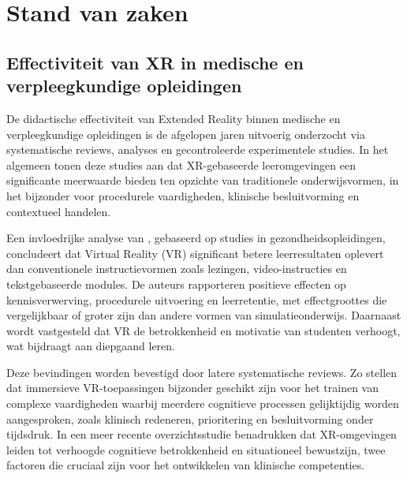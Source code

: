 \chapter{Stand van zaken}%
\label{ch:stand-van-zaken}


\section{Effectiviteit van XR in medische en verpleegkundige opleidingen}

De didactische effectiviteit van Extended Reality binnen medische en verpleegkundige opleidingen is de afgelopen jaren uitvoerig onderzocht via systematische reviews, analyses en gecontroleerde experimentele studies. In het algemeen tonen deze studies aan dat XR-gebaseerde leeromgevingen een significante meerwaarde bieden ten opzichte van traditionele onderwijsvormen, in het bijzonder voor procedurele vaardigheden, klinische besluitvorming en contextueel handelen.

Een invloedrijke analyse van \textcite{Kyaw2019VR}, gebaseerd op studies in gezondheidsopleidingen, concludeert dat Virtual Reality (VR) significant betere leerresultaten oplevert dan conventionele instructievormen zoals lezingen, video-instructies en tekstgebaseerde modules. De auteurs rapporteren positieve effecten op kennisverwerving, procedurele uitvoering en leerretentie, met effectgroottes die vergelijkbaar of groter zijn dan andere vormen van simulatieonderwijs. Daarnaast wordt vastgesteld dat VR de betrokkenheid en motivatie van studenten verhoogt, wat bijdraagt aan diepgaand leren.

Deze bevindingen worden bevestigd door latere systematische reviews. Zo stellen \textcite{Radianti2020VRHE} dat immersieve VR-toepassingen bijzonder geschikt zijn voor het trainen van complexe vaardigheden waarbij meerdere cognitieve processen gelijktijdig worden aangesproken, zoals klinisch redeneren, prioritering en besluitvorming onder tijdsdruk. In een meer recente overzichtsstudie benadrukken \textcite{Lampropoulos2025VR} dat XR-omgevingen leiden tot verhoogde cognitieve betrokkenheid en situationeel bewustzijn, twee factoren die cruciaal zijn voor het ontwikkelen van klinische competenties.


